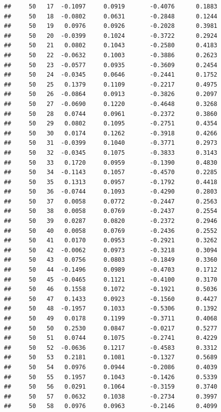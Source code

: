 \documentclass[
]{article}
\begin{document}
\begin{verbatim}
##     50   17  -0.1097     0.0919       -0.4076      0.1883 
##     50   18  -0.0802     0.0631       -0.2848      0.1244 
##     50   19   0.0976     0.0926       -0.2028      0.3981 
##     50   20  -0.0399     0.1024       -0.3722      0.2924 
##     50   21   0.0802     0.1043       -0.2580      0.4183 
##     50   22  -0.0632     0.1003       -0.3886      0.2623 
##     50   23  -0.0577     0.0935       -0.3609      0.2454 
##     50   24  -0.0345     0.0646       -0.2441      0.1752 
##     50   25   0.1379     0.1109       -0.2217      0.4975 
##     50   26  -0.0864     0.0913       -0.3826      0.2097 
##     50   27  -0.0690     0.1220       -0.4648      0.3268 
##     50   28   0.0744     0.0961       -0.2372      0.3860 
##     50   29   0.0802     0.1095       -0.2751      0.4354 
##     50   30   0.0174     0.1262       -0.3918      0.4266 
##     50   31  -0.0399     0.1040       -0.3771      0.2973 
##     50   32  -0.0345     0.1075       -0.3833      0.3143 
##     50   33   0.1720     0.0959       -0.1390      0.4830 
##     50   34  -0.1143     0.1057       -0.4570      0.2285 
##     50   35   0.1313     0.0957       -0.1792      0.4418 
##     50   36  -0.0744     0.1093       -0.4290      0.2803 
##     50   37   0.0058     0.0772       -0.2447      0.2563 
##     50   38   0.0058     0.0769       -0.2437      0.2554 
##     50   39   0.0287     0.0820       -0.2372      0.2946 
##     50   40   0.0058     0.0769       -0.2436      0.2552 
##     50   41   0.0170     0.0953       -0.2921      0.3262 
##     50   42  -0.0062     0.0973       -0.3218      0.3094 
##     50   43   0.0756     0.0803       -0.1849      0.3360 
##     50   44  -0.1496     0.0989       -0.4703      0.1712 
##     50   45  -0.0465     0.1121       -0.4100      0.3170 
##     50   46   0.1558     0.1072       -0.1921      0.5036 
##     50   47   0.1433     0.0923       -0.1560      0.4427 
##     50   48  -0.1957     0.1033       -0.5306      0.1392 
##     50   49   0.0178     0.1199       -0.3711      0.4068 
##     50   50   0.2530     0.0847       -0.0217      0.5277 
##     50   51   0.0744     0.1075       -0.2741      0.4229 
##     50   52  -0.0636     0.1217       -0.4583      0.3312 
##     50   53   0.2181     0.1081       -0.1327      0.5689 
##     50   54   0.0976     0.0944       -0.2086      0.4039 
##     50   55   0.1957     0.1043       -0.1426      0.5339 
##     50   56   0.0291     0.1064       -0.3159      0.3740 
##     50   57   0.0632     0.1038       -0.2734      0.3997 
##     50   58   0.0976     0.0963       -0.2146      0.4099 

\end{verbatim}
\end{document}
